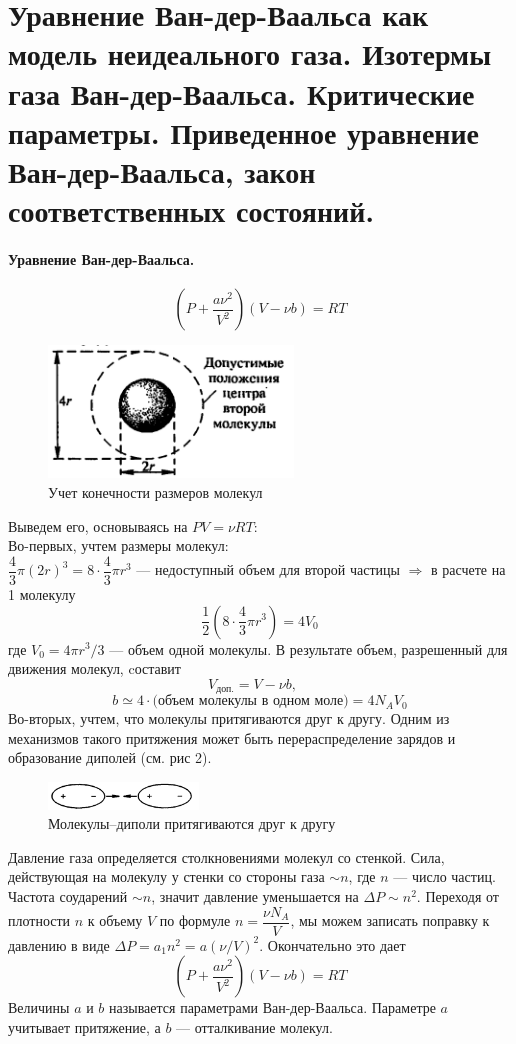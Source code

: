 \section{\normalsize Уравнение Ван-дер-Ваальса как модель неидеального газа. Изотермы газа Ван-дер-Ваальса. Критические параметры. Приведенное уравнение Ван-дер-Ваальса, закон соответственных состояний.}
\paragraph{Уравнение Ван-дер-Ваальса.}
$$\left(P+\dfrac{a\nu^2}{V^2}\right)\left(V-\nu b\right)=RT$$

\begin{figure}
	\includegraphics[width=65mm]{ris19.png}
	\caption{Учет конечности размеров молекул}
\end{figure}
Выведем его, основываясь на $PV=\nu RT$:\\
Во-первых, учтем размеры молекул: \\$\dfrac{4}{3}\pi(2r)^3=8\cdot\dfrac{4}{3}\pi r^3$ --- недоступный объем для второй частицы $\Rightarrow$ в расчете на 1 молекулу $$\dfrac{1}{2}(8\cdot\dfrac{4}{3}\pi r^3)=4V_0$$
где $V_0=4\pi r^3/3$ --- объем одной молекулы. 
В результате объем, разрешенный для движения молекул, cоставит
$$V_\text{доп.} =V-\nu b,\quad$$
$$ b\simeq4\cdot\text{(объем молекулы в одном моле)}=4N_AV_0$$
Во-вторых, учтем, что молекулы притягиваются друг к другу. Одним из механизмов такого притяжения может быть перераспределение зарядов и образование диполей (см. рис 2).

\begin{figure}
	\label{dipol}
	\includegraphics[width=40mm]{ris19_2.png}
	\caption{\small Молекулы--диполи притягиваются друг к другу}
\end{figure}
Давление газа определяется столкновениями молекул со стенкой. Сила, действующая на молекулу у стенки со стороны газа $\sim n$, где $n$ --- число частиц. Частота соударений $\sim n$, значит давление уменьшается на $\Delta P\sim n^2$. Переходя от плотности $n$ к объему $V$ по формуле $n=\dfrac{\nu N_A}{V}$, мы можем записать поправку к давлению в виде $\Delta P=a_1n^2=a(\nu/V)^2.$ Окончательно это дает
$$\left(P+\dfrac{a\nu^2}{V^2}\right)\left(V-\nu b\right)=RT$$
Величины $a$ и $b$ называется параметрами Ван-дер-Ваальса. Параметре $a$ учитывает притяжение, а $b$ --- отталкивание молекул.
